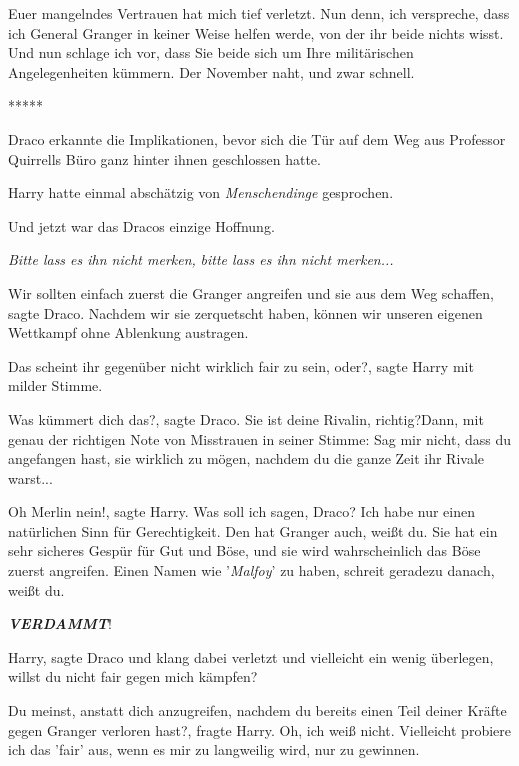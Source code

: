 \glqq{}Euer mangelndes Vertrauen hat mich tief verletzt. Nun denn, ich
verspreche, dass ich General Granger in keiner Weise helfen werde, von der ihr
beide nichts wisst. Und nun schlage ich vor, dass Sie beide sich um Ihre
militärischen Angelegenheiten kümmern. Der November naht, und zwar
schnell.\grqq{}

\begin{center}*****\end{center}

Draco erkannte die Implikationen, bevor sich die Tür auf dem Weg aus Professor
Quirrells Büro ganz hinter ihnen geschlossen hatte.

Harry hatte einmal abschätzig von \glqq{}\emph{Menschendinge}\grqq{} gesprochen.

Und jetzt war das Dracos einzige Hoffnung.

\emph{Bitte lass es ihn nicht merken,} \emph{bitte lass es ihn nicht merken...}

\glqq{}Wir sollten einfach zuerst die Granger angreifen und sie aus dem Weg
schaffen\grqq{}, sagte Draco. \glqq{}Nachdem wir sie zerquetscht haben, können
wir unseren eigenen Wettkampf ohne Ablenkung austragen.\grqq{}

\glqq{}Das scheint ihr gegenüber nicht wirklich fair zu sein, oder?\grqq{},
sagte Harry mit milder Stimme.

\glqq{}Was kümmert dich das?\grqq{}, sagte Draco. \glqq{}Sie ist deine Rivalin,
richtig?\grqq{}Dann, mit genau der richtigen Note von Misstrauen in seiner
Stimme: \glqq{}Sag mir nicht, dass du angefangen hast, sie wirklich zu mögen,
nachdem du die ganze Zeit ihr Rivale warst...\grqq{}

\glqq{}Oh Merlin nein!\grqq{}, sagte Harry. \glqq{}Was soll ich sagen, Draco?
Ich habe nur einen natürlichen Sinn für Gerechtigkeit. Den hat Granger auch,
weißt du. Sie hat ein sehr sicheres Gespür für Gut und Böse, und sie wird
wahrscheinlich das Böse zuerst angreifen. Einen Namen wie '\emph{Malfoy}' zu
haben, schreit geradezu danach, weißt du.\grqq{}

\textbf{\emph{VERDAMMT}}!

\glqq{}Harry\grqq{}, sagte Draco und klang dabei verletzt und vielleicht ein
wenig überlegen, \glqq{}willst du nicht fair gegen mich kämpfen?\grqq{}

\glqq{}Du meinst, anstatt dich anzugreifen, nachdem du bereits einen Teil deiner
Kräfte gegen Granger verloren hast?\grqq{}, fragte Harry. \glqq{}Oh, ich weiß
nicht. Vielleicht probiere ich das 'fair' aus, wenn es mir zu langweilig wird,
nur zu gewinnen.\grqq{}

